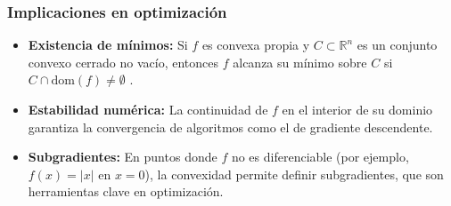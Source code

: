 \documentclass[12pt]{book}
\theoremstyle{definition}
\theoremstyle{plain}
\theoremstyle{remark}
\begin{document}
\subsubsection{Implicaciones en optimización}

\begin{itemize}
    \item \textbf{Existencia de mínimos:} Si \( f \) es convexa propia y \( C \subset \mathbb{R}^n \) es un conjunto convexo cerrado no vacío, entonces \( f \) alcanza su mínimo sobre \( C \) si \( C \cap \text{dom}(f) \neq \emptyset \) \cite{Rockafellar1970}.
    \item \textbf{Estabilidad numérica:} La continuidad de \( f \) en el interior de su dominio garantiza la convergencia de algoritmos como el de gradiente descendente.
    \item \textbf{Subgradientes:} En puntos donde \( f \) no es diferenciable (por ejemplo, \( f(x) = |x| \) en \( x = 0 \)), la convexidad permite definir subgradientes, que son herramientas clave en optimización.
\end{itemize}


%
%
\end{document}
